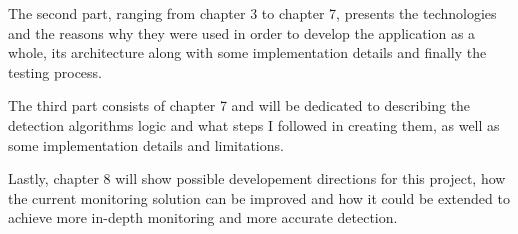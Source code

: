 \documentclass[a4paper]{article}
\begin{document}
    The second part, ranging from chapter 3 to chapter 7, presents the technologies and the reasons why they were used in order to
    develop the application as a whole, its architecture along with some implementation details and finally the testing process.

    The third part consists of chapter 7 and will be dedicated to describing the detection algorithms logic and what steps I followed in
    creating them, as well as some implementation details and limitations.

    Lastly, chapter 8 will show possible developement directions for this project, how the current monitoring solution can be improved and
    how it could be extended to achieve more in-depth monitoring and more accurate detection.

    
\end{document}
